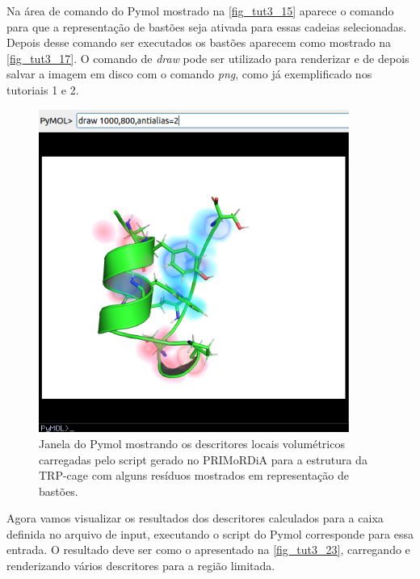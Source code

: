 \documentclass[a4paper,11pt]{refart}
\begin{document}
Na área de comando do Pymol mostrado na \autoref{fig_tut3_15} aparece o comando para que a representação de bastões seja ativada para essas cadeias selecionadas. Depois desse comando ser executados os bastões aparecem como mostrado na \autoref{fig_tut3_17}. O comando de \emph{draw} pode ser utilizado para renderizar e de depois salvar a imagem em disco com o comando \emph{png}, como já exemplificado nos tutoriais 1 e 2. 


\hspace*{-\leftmarginwidth}
\begin{minipage}{\fullwidth}
	\begin{figure}[H]
		\begin{center}
			\includegraphics[width=4in]{images/tut3_img19}
			\caption{Janela do Pymol mostrando os descritores locais volumétricos carregadas pelo script gerado no PRIMoRDiA para a estrutura da TRP-cage com alguns resíduos mostrados em representação de bastões.}
			\label{fig_tut3_17}
		\end{center}
	\end{figure}
\end{minipage}

Agora vamos visualizar os resultados dos descritores calculados para a caixa definida no arquivo de input, executando o script do Pymol corresponde para essa entrada. O resultado deve ser como o apresentado na \autoref{fig_tut3_23}, carregando e renderizando vários descritores para a região limitada. 
\end{document}
